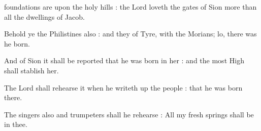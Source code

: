  foundations are upon the holy hills : the Lord loveth the gates of Sion more than all the dwellings of Jacob.\par
{}
Behold ye the Philistines also : and they of Tyre, with the Morians; lo, there was he born.\par
{}And of Sion it shall be reported that he was born in her : and the most High shall stablish her.\par
{}The Lord shall rehearse it when he writeth up the people : that he was born there.\par
{}The singers also and trumpeters shall he rehearse : All my fresh springs shall be in thee.\par


